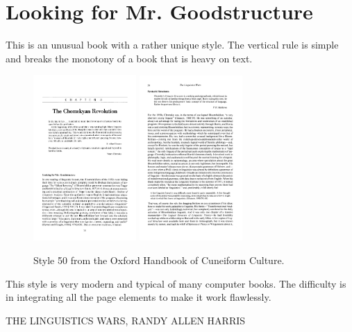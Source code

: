 \section{Looking for Mr. Goodstructure}
This is an unusual book with a rather unique style. The vertical rule is simple and breaks the monotony of a book that is heavy on text.
\begin{figure}[ht]
\centering
\includegraphics[width=0.35\textwidth]{./chapters/chapter52}
\includegraphics[width=0.35\textwidth]{./chapters/chapter52a}
\caption{Style 50 from the Oxford Handbook of Cuneiform Culture.}
\end{figure}

This style is very modern and typical of many computer books. The difficulty is in integrating all the page elements to make it work flawlessly.

THE
LINGUISTICS
WARS, RANDY ALLEN HARRIS




